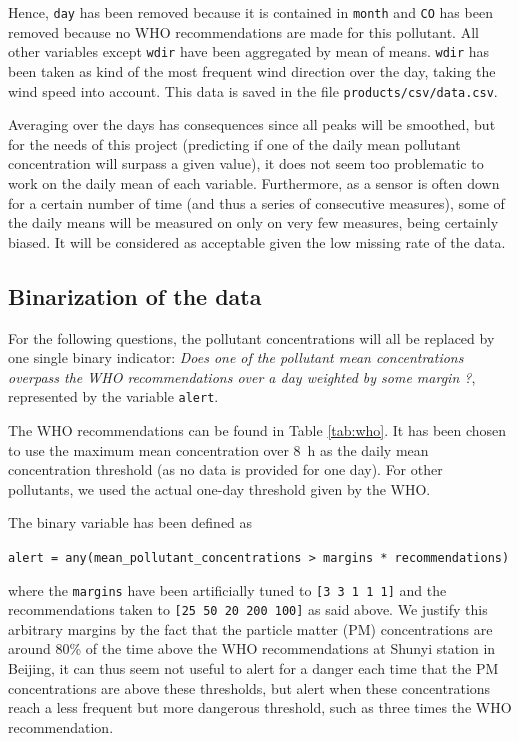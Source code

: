 \documentclass[a4paper, 12pt]{article}
\begin{document}
	Hence, \texttt{day} has been removed because it is contained in \texttt{month} and \texttt{CO} has been removed because no WHO recommendations are made for this pollutant. All other variables except \texttt{wdir} have been aggregated by mean of means. \texttt{wdir} has been taken as kind of the most frequent wind direction over the day, taking the wind speed into account. This data is saved in the file \texttt{products/csv/data.csv}.
	
	Averaging over the days has consequences since all peaks will be smoothed, but for the needs of this project (predicting if one of the daily mean pollutant concentration will surpass a given value), it does not seem too problematic to work on the daily mean of each variable. Furthermore, as a sensor is often down for a certain number of time (and thus a series of consecutive measures), some of the daily means will be measured on only on very few measures, being certainly biased. It will be considered as acceptable given the low missing rate of the data.
	
	\subsection*{Binarization of the data}
	
	For the following questions, the pollutant concentrations will all be replaced by one single binary indicator: \emph{\og{}Does one of the pollutant mean concentrations overpass the WHO recommendations over a day weighted by some margin ?\fg{}}, represented by the variable \texttt{alert}.
	
	The WHO recommendations can be found in Table \ref{tab:who}. It has been chosen to use the maximum mean concentration over \SI{8}{\hour} as the daily mean  concentration threshold (as no data is provided for one day). For other pollutants, we used the actual one-day threshold given by the WHO.
	
	The binary variable has been defined as 
	\begin{center}
	\texttt{alert = any(mean\_pollutant\_concentrations > margins * recommendations)}
	\end{center}
	
	where the \texttt{margins} have been artificially tuned to \texttt{[3 3 1 1 1]} and the recommendations taken to \texttt{[25 50 20 200 100]} as said above. We justify this arbitrary margins by the fact that the particle matter (PM) concentrations are around 80\% of the time above the WHO recommendations at Shunyi station in Beijing, it can thus seem not useful to alert for a danger each time that the PM concentrations are above these thresholds, but alert when these concentrations reach a less frequent but more dangerous threshold, such as three times the WHO recommendation.
\end{document}
